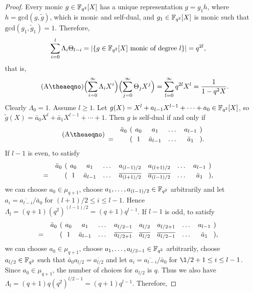 \documentclass{amsart}
\numberwithin{equation}{section}
\theoremstyle{definition}
\newcommand{\f}{\Bbb F}
\begin{document}
\begin{proof}
Every monic $g\in\f_{q^2}[X]$ has a unique representation $g=g_1h$, where $h=\text{gcd}(g,\tilde g)$, which is monic and self-dual, and $g_1\in\f_{q^2}[X]$ is monic such that $\text{gcd}(g_1,\tilde g_1)=1$. Therefore,
\[
\sum_{i=0}^l\Lambda_i\Theta_{l-i}=|\{g\in\f_{q^2}[X]\ \text{monic of degree $l$}\}|=q^{2l},
\]
that is,
\begin{equation}\tag{A\theaeqno}\label{A5}
\Bigl(\sum_{i=0}^\infty\Lambda_iX^i\Bigr)\Bigl(\sum_{j=0}^\infty\Theta_jX^j\Bigr)=\sum_{l=0}^\infty q^{2l}X^l=\frac 1{1-q^2X}.
\end{equation}
Clearly $\Lambda_0=1$. Assume $l\ge 1$. Let $g(X)=X^l+a_{l-1}X^{l-1}+\cdots+a_0\in\f_{q^2}[X]$, so $\tilde g(X)=\bar a_0X^l+\bar a_1X^{l-1}+\cdots+1$. Then $g$ is self-dual if and only if
\begin{equation}\tag{A\theaeqno}\label{A6}
\begin{array}{cccccccl}
&\bar a_0&\kern-0.6em(\kern-0.6em&a_0& a_1& \dots& a_{l-1}&\kern-0.6em)\vspace{0.2em}\cr
=&&\kern-0.6em(\kern-0.6em&1& \bar a_{l-1}& \dots& \bar a_1&\kern-0.6em).
\end{array}
\end{equation}
If $l-1$ is even, to satisfy
\[
\begin{array}{ccccccccccl}
&\bar a_0&\kern-0.6em(\kern-0.6em&a_0& a_1&\dots&a_{(l-1)/2}&a_{(l+1)/2}& \dots& a_{l-1}&\kern-0.6em)\vspace{0.2em}\cr
=&&\kern-0.6em(\kern-0.6em&1& \bar a_{l-1}&\dots&\overline{a_{(l+1)/2}}&\overline{a_{(l-1)/2}}& \dots& \bar a_1&\kern-0.6em),
\end{array}
\]
we can choose $a_0\in\mu_{q+1}$, choose $a_1,\dots,a_{(l-1)/2}\in\f_{q^2}$ arbitrarily and let $a_i=\overline{a_{l-i}}/\bar a_0$ for $(l+1)/2\le i\le l-1$. Hence $\Lambda_l=(q+1)(q^2)^{(l-1)/2}=(q+1)q^{l-1}$. If $l-1$ is odd, to satisfy
\[
\begin{array}{cccccccccccl}
&\bar a_0&\kern-0.6em(\kern-0.6em&a_0& a_1&\dots&a_{l/2-1}&a_{l/2}&a_{l/2+1}& \dots& a_{l-1}&\kern-0.6em)\vspace{0.2em}\cr
=&&\kern-0.6em(\kern-0.6em&1& \bar a_{l-1}&\dots&\overline{a_{l/2+1}}&\overline{a_{l/2}}&\overline{a_{l/2-1}}& \dots& \bar a_1&\kern-0.6em),
\end{array}
\]
we can choose $a_0\in\mu_{q+1}$, choose $a_1,\dots,a_{l/2-1}\in\f_{q^2}$ arbitrarily, choose $a_{l/2}\in\f_{q^2}$ such that $\bar a_0 a_{l/2}=\overline{a_{l/2}}$ and let $a_i=\overline{a_{l-i}}/\bar a_0$ for $\l/2+1\le i\le l-1$. Since $a_0\in\mu_{q+1}$, the number of choices for $a_{l/2}$ is $q$. Thus we also have $\Lambda_l=(q+1)q(q^2)^{l/2-1}=(q+1)q^{l-1}$. Therefore,

\end{proof}
\end{document}
